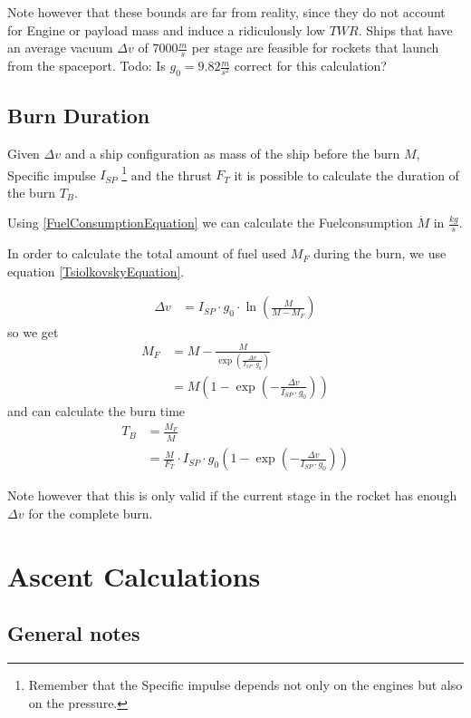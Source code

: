\documentclass[11pt]{report}
\newcommand{\dv}{{\Delta}{v}}
\newcommand{\isp}{I_{SP}}
\begin{document}
Note however that these bounds are far from reality, since they do not
account for Engine or payload mass and induce a ridiculously low
$TWR$.  Ships that have an average vacuum $\dv$ of $7000 \frac{m}{s}$
per stage are feasible for rockets that launch from the
spaceport. \cite{DeltaVMaximizationChallenge}
Todo: Is $g_0 = 9.82\frac{m}{s^2}$ correct for this calculation?
\section{Burn Duration}

Given $\dv$ and a ship configuration as mass of the ship before
the burn $M$, Specific impulse $\isp$ \footnote{Remember that the
  Specific impulse depends not only on the engines but also on the
  pressure.} and the thrust $F_T$ it is possible to
calculate the duration of the burn $T_B$. 

Using \eqref{FuelConsumptionEquation} we can calculate the
Fuelconsumption $\dot{M}$ in $\frac{kg}{s}$.

In order to calculate the total amount of fuel used $M_F$ during the
burn, we use equation \eqref{TsiolkovskyEquation}.

\begin{align*}
  \dv & = \isp\cdot g_0 \cdot \ln\left(\frac{M}{M-M_F}\right)
\end{align*}
so we get
\begin{align}
  M_F & = M-\frac{M}{\exp\left(\frac{\dv}{\isp\cdot g_0}\right)}\nonumber\\
  & = M\left(1-\exp\left(-\frac{\dv}{\isp\cdot g_0}\right)\right)
\end{align}
and can calculate the burn time
\begin{align}
  T_B & = \frac{M_F}{\dot{M}}\nonumber\\
  & = \frac{M}{F_T}\cdot \isp \cdot g_0\left(1-\exp\left(-\frac{\dv}{\isp\cdot g_0}\right)\right)
\end{align}

Note however that this is only valid if the current stage in the
rocket has enough $\dv$ for the complete burn.

\chapter{Ascent Calculations}

\section{General notes}
\end{document}
